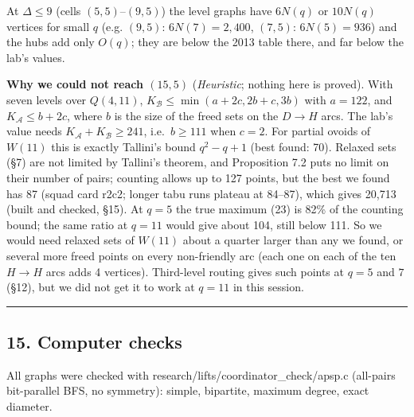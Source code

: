 \documentclass[
  11pt,
]{article}
\begin{document}
At \(\Delta\le 9\) (cells \((5,5)\)--\((9,5)\)) the level graphs have
\(6N(q)\) or \(10N(q)\) vertices for small \(q\) (e.g. \((9,5)\):
\(6N(7) = 2{,}400\), \((7,5)\): \(6N(5) = 936\)) and the hubs add only
\(O(q)\); they are below the 2013 table there, and far below the lab's
values.

\textbf{Why we could not reach \((15,5)\)} (\emph{Heuristic}; nothing
here is proved). With seven levels over \(Q(4,11)\),
\(K_{\mathcal B}\le\min(a+2c,2b+c,3b)\) with \(a = 122\), and
\(K_{\mathcal A}\le b+2c\), where \(b\) is the size of the freed sets on
the \(D\to H\) arcs. The lab's value needs
\(K_{\mathcal A}+K_{\mathcal B}\ge 241\), i.e.~\(b\ge 111\) when
\(c = 2\). For partial ovoids of \(W(11)\) this is exactly Tallini's
bound \(q^2-q+1\) (best found: 70). Relaxed sets (§7) are not limited by
Tallini's theorem, and Proposition 7.2 puts no limit on their number of
pairs; counting allows up to 127 points, but the best we found has 87
(squad card r2c2; longer tabu runs plateau at 84--87), which gives
20,713 (built and checked, §15). At \(q = 5\) the true maximum (23) is
82\% of the counting bound; the same ratio at \(q = 11\) would give
about 104, still below 111. So we would need relaxed sets of \(W(11)\)
about a quarter larger than any we found, or several more freed points
on every non-friendly arc (each one on each of the ten \(H\to H\) arcs
adds 4 vertices). Third-level routing gives such points at \(q = 5\) and
\(7\) (§12), but we did not get it to work at \(q = 11\) in this
session.

\begin{center}\rule{0.5\linewidth}{0.5pt}\end{center}

\hypertarget{computer-checks}{%
\subsection{15. Computer checks}\label{computer-checks}}

All graphs were checked with research/lifts/coordinator\_check/apsp.c
(all-pairs bit-parallel BFS, no symmetry): simple, bipartite, maximum
degree, exact diameter.
\end{document}
